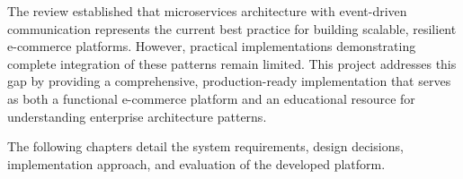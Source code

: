 The review established that microservices architecture with event-driven communication represents the current best practice for building scalable, resilient e-commerce platforms. However, practical implementations demonstrating complete integration of these patterns remain limited. This project addresses this gap by providing a comprehensive, production-ready implementation that serves as both a functional e-commerce platform and an educational resource for understanding enterprise architecture patterns.

The following chapters detail the system requirements, design decisions, implementation approach, and evaluation of the developed platform.
